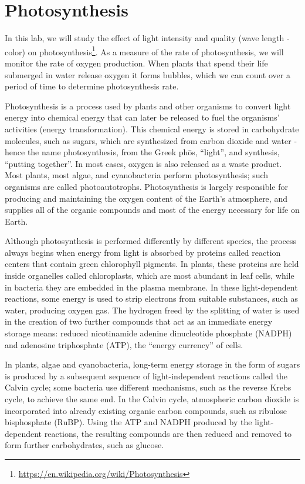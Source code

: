 \documentclass[]{book}
\let\rmarkdownfootnote\footnote%
\def\footnote{\protect\rmarkdownfootnote}
\renewcommand{\href}[2]{#2\footnote{\url{#1}}}
\theoremstyle{definition}
\theoremstyle{definition}
\theoremstyle{definition}
\theoremstyle{remark}
\begin{document}
\chapter{Photosynthesis}\label{photosynthesis}

In this lab, we will study the effect of light intensity and quality
(wave length - color) on
\href{https://en.wikipedia.org/wiki/Photosynthesis}{photosynthesis}. As
a measure of the rate of photosynthesis, we will monitor the rate of
oxygen production. When plants that spend their life submerged in water
release oxygen it forms bubbles, which we can count over a period of
time to determine photosynthesis rate.

Photosynthesis is a process used by plants and other organisms to
convert light energy into chemical energy that can later be released to
fuel the organisms' activities (energy transformation). This chemical
energy is stored in carbohydrate molecules, such as sugars, which are
synthesized from carbon dioxide and water - hence the name
photosynthesis, from the Greek phōs, ``light'', and synthesis, ``putting
together''. In most cases, oxygen is also released as a waste product.
Most plants, most algae, and cyanobacteria perform photosynthesis; such
organisms are called photoautotrophs. Photosynthesis is largely
responsible for producing and maintaining the oxygen content of the
Earth's atmosphere, and supplies all of the organic compounds and most
of the energy necessary for life on Earth.

Although photosynthesis is performed differently by different species,
the process always begins when energy from light is absorbed by proteins
called reaction centers that contain green chlorophyll pigments. In
plants, these proteins are held inside organelles called chloroplasts,
which are most abundant in leaf cells, while in bacteria they are
embedded in the plasma membrane. In these light-dependent reactions,
some energy is used to strip electrons from suitable substances, such as
water, producing oxygen gas. The hydrogen freed by the splitting of
water is used in the creation of two further compounds that act as an
immediate energy storage means: reduced nicotinamide adenine
dinucleotide phosphate (NADPH) and adenosine triphosphate (ATP), the
``energy currency'' of cells.

In plants, algae and cyanobacteria, long-term energy storage in the form
of sugars is produced by a subsequent sequence of light-independent
reactions called the Calvin cycle; some bacteria use different
mechanisms, such as the reverse Krebs cycle, to achieve the same end. In
the Calvin cycle, atmospheric carbon dioxide is incorporated into
already existing organic carbon compounds, such as ribulose bisphosphate
(RuBP). Using the ATP and NADPH produced by the light-dependent
reactions, the resulting compounds are then reduced and removed to form
further carbohydrates, such as glucose.
\end{document}
